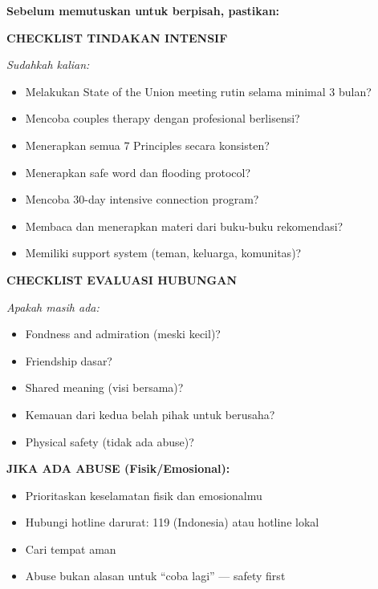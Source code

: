 \begin{warningbox}
\textbf{Sebelum memutuskan untuk berpisah, pastikan:}

\vspace{0.2cm}
\textbf{CHECKLIST TINDAKAN INTENSIF}

\textit{Sudahkah kalian:}
\begin{itemize}[itemsep=0.15cm]
    \item[$\square$] Melakukan State of the Union meeting rutin selama minimal 3 bulan?
    \item[$\square$] Mencoba couples therapy dengan profesional berlisensi?
    \item[$\square$] Menerapkan semua 7 Principles secara konsisten?
    \item[$\square$] Menerapkan safe word dan flooding protocol?
    \item[$\square$] Mencoba 30-day intensive connection program?
    \item[$\square$] Membaca dan menerapkan materi dari buku-buku rekomendasi?
    \item[$\square$] Memiliki support system (teman, keluarga, komunitas)?
\end{itemize}

\textbf{CHECKLIST EVALUASI HUBUNGAN}

\textit{Apakah masih ada:}
\begin{itemize}[itemsep=0.15cm]
    \item[$\square$] Fondness and admiration (meski kecil)?
    \item[$\square$] Friendship dasar?
    \item[$\square$] Shared meaning (visi bersama)?
    \item[$\square$] Kemauan dari kedua belah pihak untuk berusaha?
    \item[$\square$] Physical safety (tidak ada abuse)?
\end{itemize}

\textbf{JIKA ADA ABUSE (Fisik/Emosional):}
\begin{itemize}[itemsep=0.15cm]
    \item[$\square$] Prioritaskan keselamatan fisik dan emosionalmu
    \item[$\square$] Hubungi hotline darurat: 119 (Indonesia) atau hotline lokal
    \item[$\square$] Cari tempat aman
    \item[$\square$] Abuse bukan alasan untuk ``coba lagi'' --- safety first
\end{itemize}


\end{warningbox}
